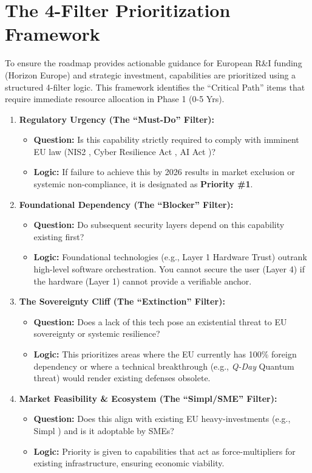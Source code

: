 \documentclass[12pt,a4paper]{report}
\begin{document}
\section{The 4-Filter Prioritization Framework}
To ensure the roadmap provides actionable guidance for European R\&I funding (Horizon Europe) and strategic investment, capabilities are prioritized using a structured 4-filter logic. This framework identifies the ``Critical Path'' items that require immediate resource allocation in Phase 1 (0-5 Yrs).

\begin{enumerate}
    \item \textbf{Regulatory Urgency (The ``Must-Do'' Filter):}
    \begin{itemize}
        \item \textbf{Question:} Is this capability strictly required to comply with imminent EU law (NIS2 \cite{nis2}, Cyber Resilience Act \cite{cra}, AI Act \cite{aiact})?
        \item \textbf{Logic:} If failure to achieve this by 2026 results in market exclusion or systemic non-compliance, it is designated as \textbf{Priority \#1}.
    \end{itemize}

    \item \textbf{Foundational Dependency (The ``Blocker'' Filter):}
    \begin{itemize}
        \item \textbf{Question:} Do subsequent security layers depend on this capability existing first?
        \item \textbf{Logic:} Foundational technologies (e.g., Layer 1 Hardware Trust) outrank high-level software orchestration. You cannot secure the user (Layer 4) if the hardware (Layer 1) cannot provide a verifiable anchor.
    \end{itemize}

    \item \textbf{The Sovereignty Cliff (The ``Extinction'' Filter):}
    \begin{itemize}
        \item \textbf{Question:} Does a lack of this tech pose an existential threat to EU sovereignty or systemic resilience?
        \item \textbf{Logic:} This prioritizes areas where the EU currently has 100\% foreign dependency or where a technical breakthrough (e.g., \textit{Q-Day} Quantum threat) would render existing defenses obsolete.
    \end{itemize}

    \item \textbf{Market Feasibility \& Ecosystem (The ``Simpl/SME'' Filter):}
    \begin{itemize}
        \item \textbf{Question:} Does this align with existing EU heavy-investments (e.g., Simpl \cite{cloud_edge_roadmap}) and is it adoptable by SMEs?
        \item \textbf{Logic:} Priority is given to capabilities that act as force-multipliers for existing infrastructure, ensuring economic viability.
    \end{itemize}
\end{enumerate}
\end{document}
